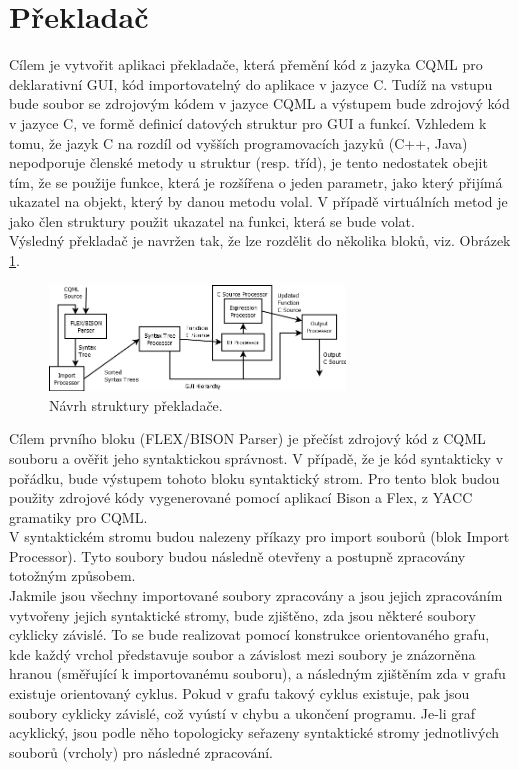 \documentclass[report,11pt]{elsarticle}
\begin{document}
\section{Překladač}
Cílem je vytvořit aplikaci překladače, která přemění kód z jazyka CQML pro deklarativní GUI, kód importovatelný do aplikace v jazyce C. Tudíž na vstupu bude soubor se zdrojovým kódem v jazyce CQML a výstupem bude zdrojový kód v jazyce C, ve formě definicí datových struktur pro GUI a funkcí. Vzhledem k tomu, že jazyk C na rozdíl od vyšších programovacích jazyků (C++, Java) nepodporuje členské metody u struktur (resp. tříd), je tento nedostatek obejit tím, že se použije funkce, která je rozšířena o jeden parametr, jako který přijímá ukazatel na objekt, který by danou metodu volal. V případě virtuálních metod je jako člen struktury použit ukazatel na funkci, která se bude volat.\\
Výsledný překladač je navržen tak, že lze rozdělit do několika bloků, viz. Obrázek \ref{fig:fig1}.\\
\begin{figure}[!ht]
\begin{center}
  \includegraphics[width=0.7\textwidth]{parserdiag}
\caption{{\label{fig:fig1}}Návrh struktury překladače.}
\end{center}
\end{figure}
Cílem prvního bloku (FLEX/BISON Parser) je přečíst zdrojový kód z CQML souboru a ověřit jeho syntaktickou správnost. V případě, že je kód syntakticky v pořádku, bude výstupem tohoto bloku syntaktický strom. Pro tento blok budou použity zdrojové kódy vygenerované pomocí aplikací Bison a Flex, z YACC gramatiky pro CQML.\\
V syntaktickém stromu budou nalezeny příkazy pro import souborů (blok Import Processor). Tyto soubory budou následně otevřeny a postupně zpracovány totožným způsobem.\\
Jakmile jsou všechny importované soubory zpracovány a jsou jejich zpracováním vytvořeny jejich syntaktické stromy, bude zjištěno, zda jsou některé soubory cyklicky závislé. To se bude realizovat pomocí konstrukce orientovaného grafu, kde každý vrchol představuje soubor a závislost mezi soubory je znázorněna hranou (směřující k importovanému souboru), a následným zjištěním zda v grafu existuje orientovaný cyklus. Pokud v grafu takový cyklus existuje, pak jsou soubory cyklicky závislé, což vyústí v chybu a ukončení programu. Je-li graf acyklický, jsou podle něho topologicky seřazeny syntaktické stromy jednotlivých souborů (vrcholy) pro následné zpracování.\\
\end{document}
